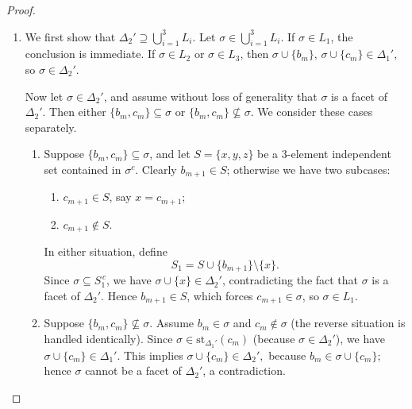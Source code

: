 \documentclass[11pt,reqno,a4paper]{amsart}
\theoremstyle{definition}
\theoremstyle{theorem}
\newcommand{\lno}{\left(}
\newcommand{\rno}{\right)}
\newcommand{\st}{\mathrm{st}}
\theoremstyle{remark}
\begin{document}
\begin{proof}
\begin{enumerate}
    \item We first show that 
    \(
        \Delta_2' \supseteq \bigcup_{i=1}^3 L_i.
    \)
    Let $\sigma \in \bigcup_{i=1}^3 L_i$. 
    If $\sigma \in L_1$, the conclusion is immediate. 
    If $\sigma \in L_2$ or $\sigma \in L_3$, then 
    $\sigma \cup \{b_m\},\, \sigma \cup \{c_m\} \in \Delta_1'$, 
    so $\sigma \in \Delta_2'$.

    Now let $\sigma \in \Delta_2'$, and assume without loss of generality that 
    $\sigma$ is a facet of $\Delta_2'$. 
    Then either 
    $\{b_m, c_m\} \subseteq \sigma$
    or 
    $\{b_m, c_m\} \not\subseteq \sigma$. 
    We consider these cases separately.

    \begin{enumerate}[label=\textbf{\Alph*.}, leftmargin=2.5em]
        \item Suppose $\{b_m, c_m\} \subseteq \sigma$, and let 
        \( S = \{x, y, z\} \) 
        be a $3$-element independent set contained in $\sigma^c$. 
        Clearly $b_{m+1} \in S$; otherwise we have two subcases:

        \begin{enumerate}[label=\roman*., leftmargin=2em]
            \item $c_{m+1} \in S$, say $x = c_{m+1}$;
            \item $c_{m+1} \notin S$.
        \end{enumerate}

        In either situation, define
        \[
            S_1 = S \cup \{b_{m+1}\} \setminus \{x\}.
        \]
        Since $\sigma \subseteq S_1^{\,c}$, we have 
        $\sigma \cup \{x\} \in \Delta_2'$, 
        contradicting the fact that $\sigma$ is a facet of $\Delta_2'$. 
        Hence $b_{m+1} \in S$, which forces 
        $c_{m+1} \in \sigma$, 
        so $\sigma \in L_1$.
        \item Suppose $\{b_m, c_m\} \not\subseteq \sigma$. 
        Assume $b_m \in \sigma$ and $c_m \notin \sigma$ 
        (the reverse situation is handled identically). 
        Since $\sigma \in \st_{\Delta_1'}\lno c_m \rno$ (because $\sigma \in \Delta_2'$), 
        we have 
        \(
            \sigma \cup \{c_m\} \in \Delta_1'.
        \)
        This implies 
        \(
            \sigma \cup \{c_m\} \in \Delta_2',
        \)
        because $b_m \in \sigma \cup \{c_m\}$; 
        hence $\sigma$ cannot be a facet of $\Delta_2'$, a contradiction. 


\end{enumerate}
\end{enumerate}
\end{proof}
\end{document}
